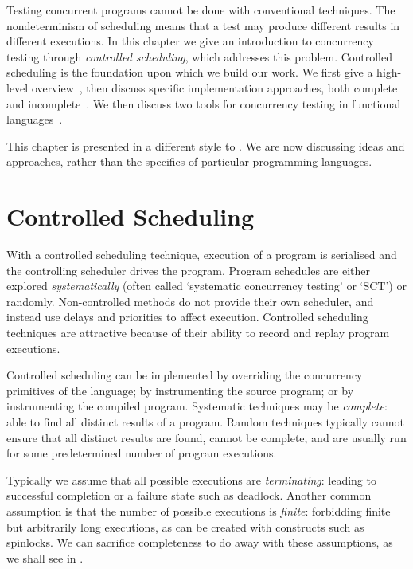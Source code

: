 Testing concurrent programs cannot be done with conventional
techniques.  The nondeterminism of scheduling means that a test may
produce different results in different executions.  In this chapter we
give an introduction to concurrency testing through \emph{controlled
  scheduling}, which addresses this problem.  Controlled scheduling is
the foundation upon which we build our work.  We first give a
high-level overview~, then discuss specific
implementation approaches, both complete~ and
incomplete~.  We then discuss two tools for
concurrency testing in functional languages~.

This chapter is presented in a different style to
.  We are now discussing ideas and
approaches, rather than the specifics of particular programming
languages.

\section{Controlled Scheduling}
\label{sec:sct-fundamentals}

With a controlled scheduling technique, execution of a program is
serialised and the controlling scheduler drives the program.  Program
schedules are either explored
\emph{systematically}\cite{coons2013,flanagan2005,musuvathi2008,musuvathi2007}
(often called `systematic concurrency testing' or `SCT') or
randomly\cite{burckhardt2010,thomson2016}.  Non-controlled methods do
not provide their own scheduler, and instead use delays and priorities
to affect execution\cite{yu2012}.  Controlled scheduling techniques
are attractive because of their ability to record and replay program
executions.

Controlled scheduling can be implemented by overriding the concurrency
primitives of the language\cite{walker2015}; by instrumenting the
source program\cite{claessen2009}; or by instrumenting the compiled
program\cite{musuvathi2006,yu2012}.  Systematic techniques may be
\emph{complete}: able to find all distinct results of a program.
Random techniques typically cannot ensure that all distinct results
are found, cannot be complete, and are usually run for some
predetermined number of program executions.

Typically we assume that all possible executions are
\emph{terminating}: leading to successful completion or a failure
state such as deadlock.  Another common assumption is that the number
of possible executions is \emph{finite}: forbidding finite but
arbitrarily long executions, as can be created with constructs such as
spinlocks\cite{siberschatz1993}.  We can sacrifice completeness to do
away with these assumptions, as we shall see in
.

